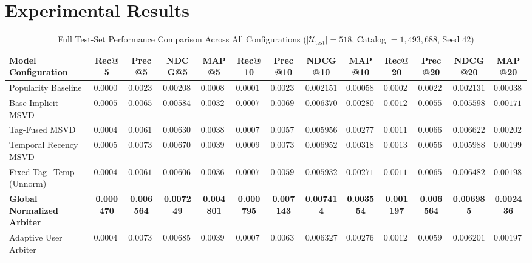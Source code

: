 \documentclass[conference]{IEEEtran}
\begin{document}
\section{Experimental Results}

\begin{table}[t]
\caption{Full Test-Set Performance Comparison Across All Configurations ($|\mathcal{U}_{\text{test}}| = 518$, Catalog $= 1,493,688$, Seed 42)}
\label{tab:main_ablation}
\centering
\begin{tabular}{lcccccccccccc}
\toprule
\textbf{Model Configuration} & \textbf{Rec@5} & \textbf{Prec@5} & \textbf{NDCG@5} & \textbf{MAP@5} & \textbf{Rec@10} & \textbf{Prec@10} & \textbf{NDCG@10} & \textbf{MAP@10} & \textbf{Rec@20} & \textbf{Prec@20} & \textbf{NDCG@20} & \textbf{MAP@20} \\
\midrule
Popularity Baseline & $0.000023$ & $0.002317$ & $0.002081$ & $0.000882$ & $0.000163$ & $0.002317$ & $0.002151$ & $0.000585$ & $0.000234$ & $0.002220$ & $0.002131$ & $0.000389$ \\
Base Implicit MSVD & $0.000532$ & $0.006564$ & $0.005840$ & $0.003224$ & $0.000795$ & $0.006950$ & $0.006370$ & $0.002802$ & $0.001267$ & $0.005502$ & $0.005598$ & $0.001718$ \\
Tag-Fused MSVD & $0.000467$ & $0.006178$ & $0.006303$ & $0.003848$ & $0.000707$ & $0.005792$ & $0.005956$ & $0.002772$ & $0.001199$ & $0.006660$ & $0.006622$ & $0.002023$ \\
Temporal Recency MSVD & $0.000549$ & $0.007336$ & $0.006702$ & $0.003951$ & $0.000923$ & $0.007336$ & $0.006952$ & $0.003186$ & $0.001302$ & $0.005695$ & $0.005988$ & $0.001990$ \\
Fixed Tag+Temp (Unnorm) & $0.000467$ & $0.006178$ & $0.006062$ & $0.003655$ & $0.000710$ & $0.005985$ & $0.005932$ & $0.002710$ & $0.001191$ & $0.006564$ & $0.006482$ & $0.001981$ \\
\textbf{Global Normalized Arbiter} & \textbf{0.000470} & \textbf{0.006564} & \textbf{0.007249} & \textbf{0.004801} & \textbf{0.000795} & \textbf{0.007143} & \textbf{0.007414} & \textbf{0.003554} & \textbf{0.001197} & \textbf{0.006564} & \textbf{0.006985} & \textbf{0.002436} \\
Adaptive User Arbiter & $0.000464$ & $0.007336$ & $0.006850$ & $0.003964$ & $0.000759$ & $0.006371$ & $0.006327$ & $0.002763$ & $0.001208$ & $0.005985$ & $0.006201$ & $0.001979$ \\
\bottomrule
\end{tabular}
\end{table}
\end{document}
